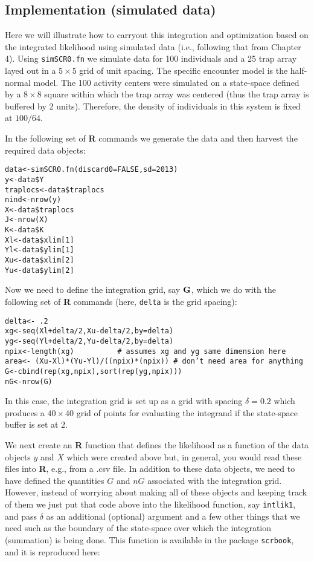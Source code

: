 \subsection{ Implementation (simulated data)}

Here we will illustrate how to carryout this integration and
optimization based on the integrated likelihood using simulated data
 (i.e., following that from Chapter 4). Using \mbox{\tt simSCR0.fn}
 we simulate data for 100 individuals and a 25 trap array
layed out in a $5 \times 5$ grid of unit spacing.  The specific encounter
model is the half-normal model. The 100 activity centers were
simulated on a state-space defined by a $8 \times 8$ square 
within which the
trap array was centered (thus the trap array is buffered by 2
units). Therefore, the density of individuals in this system is fixed
at $100/64$.

In the following set of {\bf R} commands we generate the data and 
then harvest the required data objects:
{\small
\begin{verbatim}
data<-simSCR0.fn(discard0=FALSE,sd=2013)
y<-data$Y
traplocs<-data$traplocs
nind<-nrow(y)
X<-data$traplocs
J<-nrow(X)
K<-data$K
Xl<-data$xlim[1]
Yl<-data$ylim[1]
Xu<-data$xlim[2]
Yu<-data$ylim[2]
\end{verbatim}
}
Now we need to define the integration grid, say ${\bf G}$, which we do with
the following set of {\bf R} commands (here, \mbox{\tt delta} is the grid spacing):
{\small
\begin{verbatim}
delta<- .2
xg<-seq(Xl+delta/2,Xu-delta/2,by=delta) 
yg<-seq(Yl+delta/2,Yu-delta/2,by=delta) 
npix<-length(xg)          # assumes xg and yg same dimension here
area<- (Xu-Xl)*(Yu-Yl)/((npix)*(npix)) # don’t need area for anything
G<-cbind(rep(xg,npix),sort(rep(yg,npix)))
nG<-nrow(G)
\end{verbatim}
}
In this case, the integration grid is set up as a grid with spacing
$\delta = 0.2$ which produces a $40 \times 40$ grid of points for evaluating the
integrand if the state-space buffer is set at 2.

We next create an {\bf R} function that defines the likelihood as a function
of the data objects $y$ and $X$ which were created above but, in general,
you would read these files into {\bf R}, e.g., from a .csv file.
In addition to these data
objects, we need to have defined the  quantities $G$ and $nG$ associated
with the integration grid.
However, instead of worrying about making all of these objects and
keeping track of them we just put that code above into the likelihood
function, say \mbox{\tt intlik1}, and pass $\delta$ as an additional (optional) argument and a
few other things that we need such as the boundary of the state-space
over which the integration (summation) is being done. This function is
available in the package \mbox{\tt scrbook}, and it is reproduced here:

